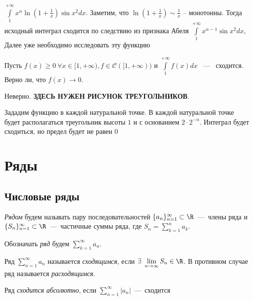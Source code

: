 \begin{example}
    $\int\limits_{1}^{+\infty} x^{\alpha}\ln(1 + \frac{1}{x})\sin x^2 dx$. Заметим, что $\ln (1 + \frac{1}{x}) \sim \frac{1}{x}$ -- монотонны. Тогда исходный интеграл сходится по следствию из признака Абеля $\int\limits_{1}^{+\infty} x^{\alpha - 1} \sin x^2 dx$, Далее уже необходимо исследовать эту функцию 
\end{example}

\begin{example}
    Пусть $f(x) \ge 0 \ \forall x \in [1, + \infty), f \in \mathcal{C}([1, +\infty)) \text{ и } \int\limits_{1}^{+\infty} f(x) dx $ ~---~ сходится. Верно ли, что $f(x) \rightarrow 0$. 

    \noindent Неверно. \textbf{ЗДЕСЬ НУЖЕН РИСУНОК ТРЕУГОЛЬНИКОВ}. 

    \noindent Зададим функцию в каждой натуральной точке. В каждой натуральной точке будет располагаться треугольник высоты $1$ и с основанием $2 \cdot 2^{-n}$. Интеграл будет сходиться, но предел будет не равен $0$
\end{example}

\section{Ряды}

\subsection{Числовые ряды}

\begin{definition}
    \textit{Рядом} будем называть пару последовательностей $\{a_n\}_{n = 1}^{\infty} \subset \R$~---~члены ряда и $\{ S_n\}_{n = 1}^{\infty} \subset \R$~---~частичные суммы ряда, где $S_n = \sum_{k = 1}^{n} a_k$.
    
    Обозначать \textit{ряд} будем $\sum_{k = 1}^{\infty}a_n$. 
\end{definition}

\begin{definition}
    Ряд $\sum_{n = 1}^{\infty} a_n$ называется \textit{сходящимся}, если $\exists \ \lim\limits_{n\to \infty} S_n \in \R$. В противном случае ряд называется \textit{расходящимся}. 
\end{definition}

\begin{definition}
    Ряд \textit{сходится абсолютно}, если  $\sum_{n = 1}^{\infty}|a_n|$~---~сходится
\end{definition}

